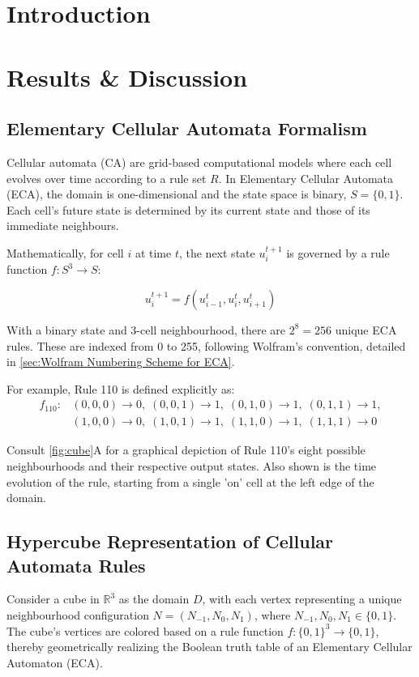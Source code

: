 \section{Introduction}
\label{sec:introduction}
\section{Results \& Discussion}

\subsection*{Elementary Cellular Automata Formalism}
Cellular automata (CA) are grid-based computational models where each cell evolves over time according to a rule set \( R \). In Elementary Cellular Automata (ECA), the domain is one-dimensional and the state space is binary, \( S = \{0, 1\} \). Each cell's future state is determined by its current state and those of its immediate neighbours.

Mathematically, for cell \( i \) at time \( t \), the next state \( u_i^{t+1} \) is governed by a rule function \( f: S^3 \to S \):

\[
u_i^{t+1} = f(u_{i-1}^t, u_i^t, u_{i+1}^t)
\]

With a binary state and 3-cell neighbourhood, there are \( 2^8 = 256 \) unique ECA rules. These are indexed from 0 to 255, following Wolfram's convention, detailed in \autoref*{sec:Wolfram Numbering Scheme for ECA}.

For example, Rule 110 is defined explicitly as:
\[
\begin{array}{ll}
f_{\text{110}}: & (0,0,0) \to 0, \; (0,0,1) \to 1, \; (0,1,0) \to 1, \; (0,1,1) \to 1, \\
& (1,0,0) \to 0, \; (1,0,1) \to 1, \; (1,1,0) \to 1, \; (1,1,1) \to 0
\end{array}
\]

Consult \autoref{fig:cube}A for a graphical depiction of Rule 110's eight possible neighbourhoods and their respective output states. Also shown is the time evolution of the rule, starting from a single 'on' cell at the left edge of the domain.

\subsection*{Hypercube Representation of Cellular Automata Rules}
Consider a cube in \( \mathbb{R}^3 \) as the domain \( D \), with each vertex representing a unique neighbourhood configuration \( N = (N_{-1}, N_0, N_1) \), where \( N_{-1}, N_0, N_1 \in \{0, 1\} \). The cube's vertices are colored based on a rule function \( f: \{0, 1\}^3 \to \{0, 1\} \), thereby geometrically realizing the Boolean truth table of an Elementary Cellular Automaton (ECA).


